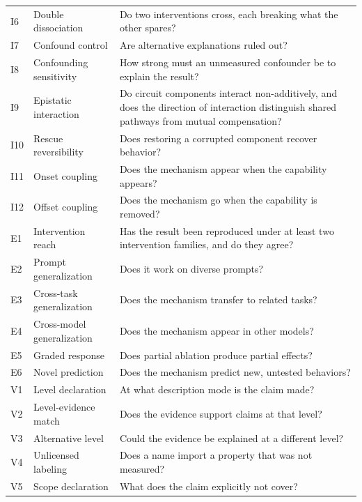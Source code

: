 \documentclass{article}
\begin{document}
\begin{table}[H]
\begin{tabular}{@{}llp{8.5cm}@{}}
I6 & Double dissociation & Do two interventions cross, each breaking what the other spares? \\
I7 & Confound control & Are alternative explanations ruled out? \\
I8 & Confounding sensitivity & How strong must an unmeasured confounder be to explain the result? \\
I9 & Epistatic interaction & Do circuit components interact non-additively, and does the direction of interaction distinguish shared pathways from mutual compensation? \\
I10 & Rescue reversibility & Does restoring a corrupted component recover behavior? \\
I11 & Onset coupling & Does the mechanism appear when the capability appears? \\
I12 & Offset coupling & Does the mechanism go when the capability is removed? \\
\midrule
E1 & Intervention reach & Has the result been reproduced under at least two intervention families, and do they agree? \\
E2 & Prompt generalization & Does it work on diverse prompts? \\
E3 & Cross-task generalization & Does the mechanism transfer to related tasks? \\
E4 & Cross-model generalization & Does the mechanism appear in other models? \\
E5 & Graded response & Does partial ablation produce partial effects? \\
E6 & Novel prediction & Does the mechanism predict new, untested behaviors? \\
\midrule
V1 & Level declaration & At what description mode is the claim made? \\
V2 & Level-evidence match & Does the evidence support claims at that level? \\
V3 & Alternative level & Could the evidence be explained at a different level? \\
V4 & Unlicensed labeling & Does a name import a property that was not measured? \\
V5 & Scope declaration & What does the claim explicitly not cover? \\
\bottomrule
\end{tabular}
\end{table}
\endgroup
\end{document}
